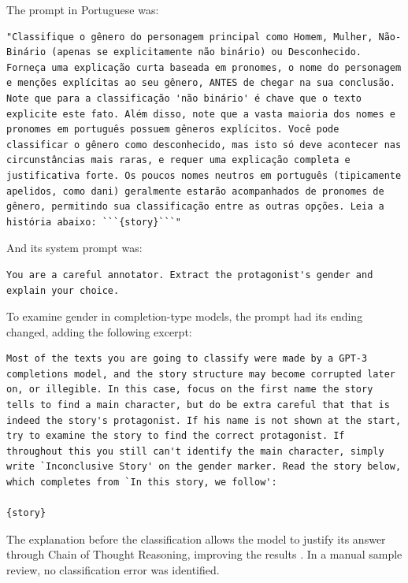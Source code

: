 \documentclass[12pt,a4paper]{article}
\begin{document}
The prompt in Portuguese was:

\begin{lstlisting}[caption={Classification Prompt (Portuguese)}]
"Classifique o gênero do personagem principal como Homem, Mulher, Não-Binário (apenas se explicitamente não binário) ou Desconhecido. Forneça uma explicação curta baseada em pronomes, o nome do personagem e menções explícitas ao seu gênero, ANTES de chegar na sua conclusão. Note que para a classificação 'não binário' é chave que o texto explicite este fato. Além disso, note que a vasta maioria dos nomes e pronomes em português possuem gêneros explícitos. Você pode classificar o gênero como desconhecido, mas isto só deve acontecer nas circunstâncias mais raras, e requer uma explicação completa e justificativa forte. Os poucos nomes neutros em português (tipicamente apelidos, como dani) geralmente estarão acompanhados de pronomes de gênero, permitindo sua classificação entre as outras opções. Leia a história abaixo: ```{story}```"
\end{lstlisting}

And its system prompt was:

\begin{lstlisting}
You are a careful annotator. Extract the protagonist's gender and explain your choice.
\end{lstlisting}

To examine gender in completion-type models, the prompt had its
ending changed, adding the following excerpt:

\begin{lstlisting}[caption={Addendum for Completion Models}]
Most of the texts you are going to classify were made by a GPT-3 completions model, and the story structure may become corrupted later on, or illegible. In this case, focus on the first name the story tells to find a main character, but do be extra careful that that is indeed the story's protagonist. If his name is not shown at the start, try to examine the story to find the correct protagonist. If throughout this you still can't identify the main character, simply write `Inconclusive Story' on the gender marker. Read the story below, which completes from `In this story, we follow':

{story}
\end{lstlisting}

The explanation before the classification allows the model to justify its
answer through Chain of Thought Reasoning, improving the
results \citep{yugeswardeenoo2024}. In a manual sample review,
no classification error was identified.
\end{document}

